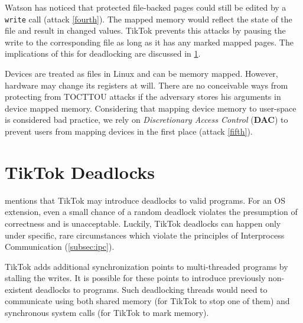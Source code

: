 Watson has noticed that protected file-backed pages could still be edited by a
\texttt{write} call (attack \ref{fourth}). The mapped memory would reflect the state
of the file and result in changed values. TikTok prevents this attacks by
pausing the write to the corresponding file as long as it has any marked mapped
pages. The implications of this for deadlocking are discussed in
\cref{sec:deadlocks}. 

Devices are treated as files in Linux and can be memory mapped. However, 
hardware may change its registers at will. There are no conceivable ways from 
protecting from TOCTTOU attacks if the adversary stores his arguments in device
mapped memory. Considering that mapping device memory to user-space is considered
bad practice, we rely on \emph{Discretionary Access Control} (\textbf{DAC}) to 
prevent users from mapping devices in the first place (attack \ref{fifth}).


\section{TikTok Deadlocks}
\label{sec:deadlocks}

 mentions that TikTok may introduce deadlocks to valid
programs. For an OS extension, even a small chance of a random deadlock violates
the presumption of correctness and is unacceptable. Luckily, TikTok deadlocks can
happen only under specific, rare circumstances which violate the principles of
Interprocess Communication (\cref{subsec:ipc}).

TikTok adds additional synchronization points to multi-threaded programs by
stalling the writes. It is possible for these points to introduce previously
non-existent deadlocks to programs. Such deadlocking threads would need to
communicate using both shared memory (for TikTok to stop one of them) and
synchronous system calls (for TikTok to mark memory).

